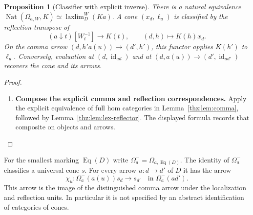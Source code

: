 \documentclass[oneside]{article}
\theoremstyle{plain}
\newtheorem{proposition}[theorem]{Proposition}
\theoremstyle{definition}
\theoremstyle{remark}
\newcommand{\Eq}{\operatorname{Eq}}
\newcommand{\Nat}{\operatorname{Nat}}
\newcommand{\id}{\operatorname{id}}
\newcommand{\laxlim}{\mathop{\mathrm{laxlim}}}
\begin{document}
\begin{proposition}[Classifier with explicit inverse]\label{prop:classifier}
There is a natural equivalence $\Nat(\Omega_{a,W},K)\simeq\laxlim_D^W(Ka).$ A cone $(x_d,\ell_u)$ is classified by the reflection transpose of
\begin{equation}\label{eq:classifyformula}
 (a\downarrow t)[W_t^{-1}]\longrightarrow K(t),
 \qquad(d,h)\longmapsto K(h)x_d.
\end{equation}
On the comma arrow $(d,h'a(u))\to(d',h')$, this functor applies
$K(h')$ to $\ell_u$. Conversely, evaluation at $(d,\id_{ad})$ and
at $(d,a(u))\to(d',\id_{ad'})$ recovers the cone and its arrows.
\end{proposition}
\begin{proof}
\leavevmode
\begin{enumerate}
\item \textbf{Compose the explicit comma and reflection correspondences.} Apply the explicit equivalence of full hom categories in
Lemma~\ref{thz:lem:comma}, followed by
Lemma~\ref{thz:lem:lex-reflector}. The displayed formula records that
composite on objects and arrows.\qedhere
\end{enumerate}
\end{proof}

For the smallest marking $\Eq(D)$ write $\Omega_a^-=\Omega_{a,\Eq(D)}.$ The identity of $\Omega_a^-$ classifies a universal cone $s$. For every arrow $u:d\to d'$ of $D$ it has the arrow
\[
 \chi_u:\Omega_a^-(a(u))s_d\longrightarrow s_{d'}
 \quad\text{in }\Omega_a^-(ad').
\]
This arrow is the image of the distinguished comma arrow under the localization and reflection units. In particular it is not specified by an abstract identification of categories of cones.
\end{document}
